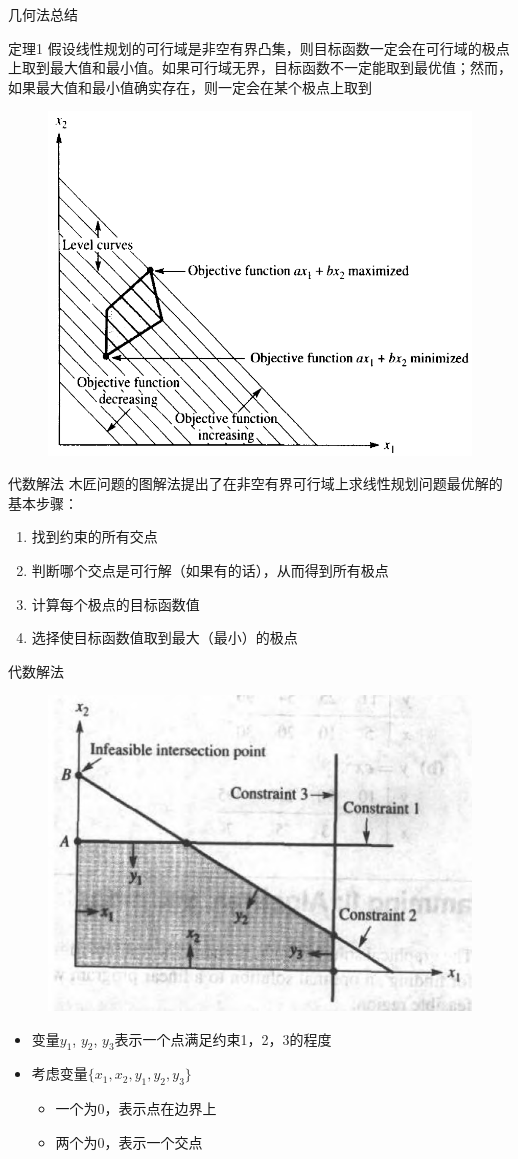 \documentclass[UTF8]{ctexbeamer}
\begin{document}
\begin{frame}{几何法总结}
  \begin{block}{定理1}
    假设线性规划的可行域是非空有界凸集，则目标函数一定会在可行域的极点上取到最大值和最小值。如果可行域无界，目标函数不一定能取到最优值；然而，如果最大值和最小值确实存在，则一定会在某个极点上取到
  \end{block}

  \begin{figure}
    \centering
    \includegraphics[width=.4\textwidth{}]{extreme.png}
  \end{figure}
\end{frame}

\begin{frame}{代数解法}
  木匠问题的图解法提出了在非空有界可行域上求线性规划问题最优解的基本步骤：
  \begin{enumerate}
  \item 找到约束的所有交点
  \item 判断哪个交点是可行解（如果有的话），从而得到所有极点
  \item 计算每个极点的目标函数值
  \item 选择使目标函数值取到最大（最小）的极点
  \end{enumerate}
  
\end{frame}

\begin{frame}{代数解法}
  \begin{figure}
    \centering
    \includegraphics[width=.6\textwidth{}]{inter.png}
  \end{figure}

  \begin{itemize}
  \item 变量$y_1$, $y_2$, $y_3$表示一个点满足约束1，2，3的程度
  \item 考虑变量$\{x_1, x_2, y_1, y_2, y_3\}$
    \begin{itemize}
    \item 一个为0，表示点在边界上
    \item 两个为0，表示一个交点
    \end{itemize}
  \end{itemize}
\end{frame}
\end{document}
